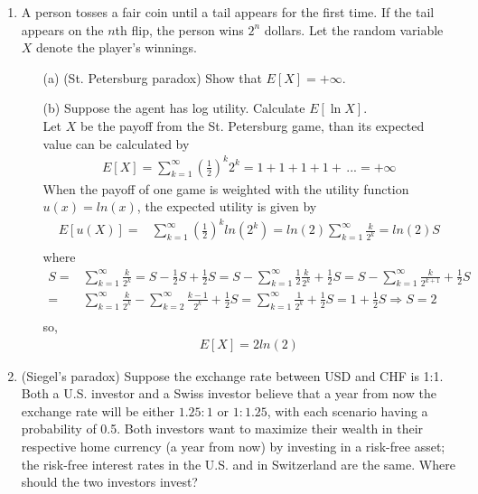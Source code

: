 \documentclass[letterpaper,12pt]{article}
\theoremstyle{definition}
\begin{document}
\begin{enumerate}
   	\item A person tosses a fair coin until a tail appears for the first time. If the tail appears on the $n$th flip, the person wins $2^n$ dollars. Let the random variable $X$ denote the player's winnings.
		\begin{itemize}
			\item[(a)] (St. Petersburg paradox) Show that $E[X]= + \infty$.
			\item[(b)] Suppose the agent has log utility. Calculate $E[\ln X]$.\\
			

Let $X$ be the payoff from the St. Petersburg game, than its expected value can be calculated by
\begin{align*}
E[X] = \sum_{k=1}^\infty \left(\frac{1}{2} \right)^k 2^{k} =1+ 1+ 1+ 1+ \,... = +\infty
\end{align*}
When the payoff of one game is weighted with the utility function $u(x)=ln(x)$, the expected utility is given by
\begin{align*}
E[u(X)] =& \sum_{k=1}^\infty \left(\frac{1}{2}\right)^k  ln(2^{k}) =  ln(2) \sum_{k=1}^\infty \frac{k}{2^k} = ln(2) S \\ 
\end{align*} where
\begin{align*}
S=& \sum_{k=1}^\infty \frac{k}{2^k} = S -\frac{1}{2}S+ \frac{1}{2}S = S-\sum_{k=1}^\infty \frac{1}{2}\frac{k}{2^k}+ \frac{1}{2}S = S-\sum_{k=1}^\infty \frac{k}{2^{k+1}}+ \frac{1}{2}S \\
=&  \sum_{k=1}^\infty \frac{k}{2^k}- \sum_{k=2}^\infty \frac{k-1}{2^{k}}+ \frac{1}{2}S = \sum^{\infty}_{k=1} \frac{1}{2^k} + \frac{1}{2}S = 1 + \frac{1}{2}S \Rightarrow S=2\\
\end{align*}
so,
\begin{align*}
E[X] = 2ln(2)
\end{align*}
		\end{itemize}
	\item (Siegel's paradox) Suppose the exchange rate between USD and CHF is 1:1. Both a U.S. investor and a Swiss investor believe that a year from now the exchange rate will be either $1.25:1$ or $1:1.25$, with each scenario having a probability of 0.5. Both investors want to maximize their wealth in their respective home currency (a year from now) by investing in a risk-free asset; the risk-free interest rates in the U.S. and in Switzerland are the same. Where should the two investors invest?


\end{enumerate}
\end{document}
